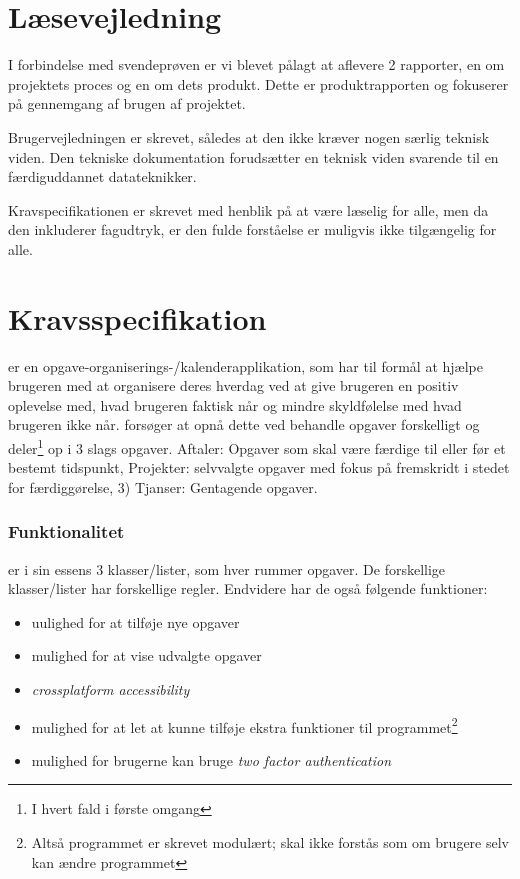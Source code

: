 \documentclass{report}
\begin{document}
\maketitle
\makeTechTitlecard
\tableofcontents

\chapter{Læsevejledning}

I forbindelse med svendeprøven er vi blevet pålagt at aflevere 2 rapporter, en om projektets proces og en om dets produkt. Dette er produktrapporten og fokuserer på gennemgang af brugen af projektet.\par{}
Brugervejledningen er skrevet, således at den ikke kræver nogen særlig teknisk viden.
Den tekniske dokumentation forudsætter en teknisk viden svarende til en færdiguddannet datateknikker.\par{}
Kravspecifikationen er skrevet med henblik  på at være læselig for alle, men da den inkluderer fagudtryk, er den fulde forståelse er muligvis ikke tilgængelig for alle.

\chapter{Kravsspecifikation}
\label{kravspec}

\projectName{} er en opgave-organiserings-/kalenderapplikation, som har til formål at hjælpe brugeren med at organisere deres hverdag ved at give brugeren en positiv oplevelse med, hvad brugeren faktisk når og mindre skyldfølelse med hvad brugeren ikke når. \projectName{} forsøger at opnå dette ved behandle opgaver forskelligt og deler\footnote{I hvert fald i første omgang} op i 3 slags opgaver. Aftaler: Opgaver som skal være færdige til eller før et bestemt tidspunkt, Projekter: selvvalgte opgaver med fokus på fremskridt i stedet for færdiggørelse, 3) Tjanser: Gentagende opgaver.

\subsection{Funktionalitet}

\projectName{} er i sin essens 3 klasser/lister, som hver rummer opgaver. De forskellige klasser/lister har forskellige regler. Endvidere har de også følgende funktioner:
\begin{itemize}
\item uulighed for at tilføje nye opgaver
\item mulighed for at vise udvalgte opgaver
\item \textit{crossplatform accessibility}
\item mulighed for at let at kunne tilføje ekstra funktioner til programmet\footnote{Altså programmet er skrevet modulært; skal ikke forstås som om brugere selv kan ændre programmet}
\item mulighed for brugerne kan bruge \textit{two factor authentication}
\end{itemize}
\end{document}
